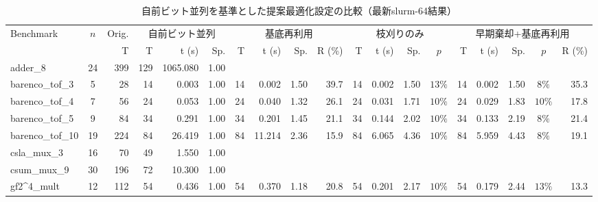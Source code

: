 \begin{table}[H]
\centering
\caption{自前ビット並列を基準とした提案最適化設定の比較（最新slurm-64結果）}
\label{tab:optimization_comparison_bitparallel_baseline}
\scriptsize
\setlength{\tabcolsep}{1.5pt}
\renewcommand{\arraystretch}{1.3}
\begin{tabular}{l c r | r r r | r r r r | r r r c | r r r c r}
\toprule
\multirow{2}{*}{Benchmark} & \multirow{2}{*}{$n$} & \multicolumn{1}{c|}{Orig.} & \multicolumn{3}{c|}{自前ビット並列} & \multicolumn{4}{c|}{基底再利用} & \multicolumn{4}{c|}{枝刈りのみ} & \multicolumn{5}{c}{早期棄却+基底再利用} \\
\cmidrule(lr){3-3} \cmidrule(lr){4-6} \cmidrule(lr){7-10} \cmidrule(lr){11-14} \cmidrule(lr){15-19}
 & & T & T & t (s) & Sp. & T & t (s) & Sp. & R (\%) & T & t (s) & Sp. & $p$ & T & t (s) & Sp. & $p$ & R (\%) \\
\midrule
adder\_8 & 24 & 399 & \cellcolor{bestT}129 & 1065.080 & \cellcolor{bestTime}1.00 &  &  &  &  &  &  &  &  &  &  &  &  &  \\
barenco\_tof\_3 & 5 & 28 & \cellcolor{bestT}14 & 0.003 & 1.00 & \cellcolor{bestT}14 & 0.002 & \cellcolor{bestTime}1.50 & 39.7 & \cellcolor{bestT}14 & 0.002 & \cellcolor{bestTime}1.50 & $13\%$ & \cellcolor{bestT}14 & 0.002 & \cellcolor{bestTime}1.50 & $8\%$ & 35.3 \\
barenco\_tof\_4 & 7 & 56 & \cellcolor{bestT}24 & 0.053 & 1.00 & \cellcolor{bestT}24 & 0.040 & 1.32 & 26.1 & \cellcolor{bestT}24 & 0.031 & 1.71 & $10\%$ & \cellcolor{bestT}24 & 0.029 & \cellcolor{bestTime}1.83 & $10\%$ & 17.8 \\
barenco\_tof\_5 & 9 & 84 & \cellcolor{bestT}34 & 0.291 & 1.00 & \cellcolor{bestT}34 & 0.201 & 1.45 & 21.1 & \cellcolor{bestT}34 & 0.144 & 2.02 & $10\%$ & \cellcolor{bestT}34 & 0.133 & \cellcolor{bestTime}2.19 & $8\%$ & 21.4 \\
barenco\_tof\_10 & 19 & 224 & \cellcolor{bestT}84 & 26.419 & 1.00 & \cellcolor{bestT}84 & 11.214 & 2.36 & 15.9 & \cellcolor{bestT}84 & 6.065 & 4.36 & $10\%$ & \cellcolor{bestT}84 & 5.959 & \cellcolor{bestTime}4.43 & $8\%$ & 19.1 \\
csla\_mux\_3 & 16 & 70 & \cellcolor{bestT}49 & 1.550 & \cellcolor{bestTime}1.00 &  &  &  &  &  &  &  &  &  &  &  &  &  \\
csum\_mux\_9 & 30 & 196 & \cellcolor{bestT}72 & 10.300 & \cellcolor{bestTime}1.00 &  &  &  &  &  &  &  &  &  &  &  &  &  \\
gf2\textasciicircum4\_mult & 12 & 112 & \cellcolor{bestT}54 & 0.436 & 1.00 & \cellcolor{bestT}54 & 0.370 & 1.18 & 20.8 & \cellcolor{bestT}54 & 0.201 & 2.17 & $10\%$ & \cellcolor{bestT}54 & 0.179 & \cellcolor{bestTime}2.44 & $13\%$ & 13.3 \\

\end{tabular}
\end{table}
